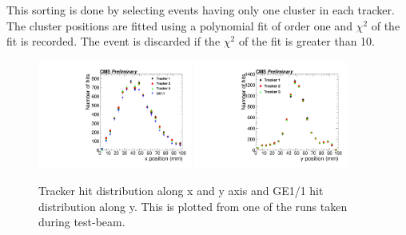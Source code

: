 This sorting is done by selecting events having only one cluster in each tracker. The cluster positions are fitted using a polynomial fit of order one and $\chi^2$ of the fit is recorded.
The event is discarded if the $\chi^2$ of the fit is greater than 10.
\begin{figure}[!htbp]
\centering
\includegraphics[width=0.45\textwidth]{figures/GEM/Tracker_Hit_position_Run1644_x.pdf}%
\includegraphics[width=0.45\textwidth]{figures/GEM/Tracker_Hit_position_Run1644_y.pdf}
\caption{Tracker hit distribution along x and y axis and GE1/1 hit distribution along y. This is plotted from one of the runs taken during test-beam.}
\label{HitPosXaxis}
\end{figure}
